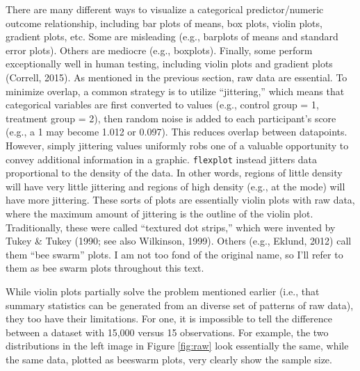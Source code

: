 \documentclass[
  man]{apa6}
\begin{document}
There are many different ways to visualize a categorical predictor/numeric outcome relationship, including bar plots of means, box plots, violin plots, gradient plots, etc. Some are misleading (e.g., barplots of means and standard error plots). Others are mediocre (e.g., boxplots). Finally, some perform exceptionally well in human testing, including violin plots and gradient plots (Correll, 2015). As mentioned in the previous section, raw data are essential. To minimize overlap, a common strategy is to utilize \enquote{jittering,} which means that categorical variables are first converted to values (e.g., control group = 1, treatment group = 2), then random noise is added to each participant's score (e.g., a 1 may become 1.012 or 0.097). This reduces overlap between datapoints. However, simply jittering values uniformly robs one of a valuable opportunity to convey additional information in a graphic. \texttt{flexplot} instead jitters data proportional to the density of the data. In other words, regions of little density will have very little jittering and regions of high density (e.g., at the mode) will have more jittering. These sorts of plots are essentially violin plots with raw data, where the maximum amount of jittering is the outline of the violin plot. Traditionally, these were called \enquote{textured dot strips,} which were invented by Tukey \& Tukey (1990; see also Wilkinson, 1999). Others (e.g., Eklund, 2012) call them \enquote{bee swarm} plots. I am not too fond of the original name, so I'll refer to them as bee swarm plots throughout this text.

While violin plots partially solve the problem mentioned earlier (i.e., that summary statistics can be generated from an diverse set of patterns of raw data), they too have their limitations. For one, it is impossible to tell the difference between a dataset with 15,000 versus 15 observations. For example, the two distributions in the left image in Figure \ref{fig:raw} look essentially the same, while the same data, plotted as beeswarm plots, very clearly show the sample size.
\end{document}
